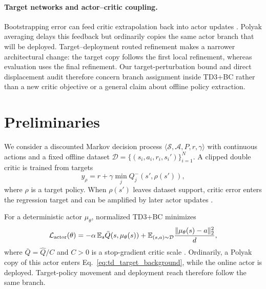 \documentclass[letterpaper]{article}
\begin{document}
\paragraph{Target networks and actor--critic coupling.}
Bootstrapping error can feed critic extrapolation back into actor updates
\citep{fujimoto2019offpolicy,kumar2019bear}. Polyak averaging delays this
feedback but ordinarily copies the same actor branch that will be deployed.
Target--deployment routed refinement makes a narrower architectural change:
the target copy follows the first local refinement, whereas evaluation uses
the final refinement. Our target-perturbation bound and direct displacement
audit therefore concern branch assignment inside TD3+BC rather than a new
critic objective or a general claim about offline policy extraction.

\section{Preliminaries}
\label{sec:background}

We consider a discounted Markov decision process
$\langle\mathcal S,\mathcal A,P,r,\gamma\rangle$ with continuous actions and
a fixed offline dataset $\mathcal D=\{(s_i,a_i,r_i,s_i')\}_{i=1}^N$. A clipped
double critic is trained from targets
\begin{equation}
y_{\rho}=r+\gamma\min_j Q_j^-(s',\rho(s')),
\label{eq:td_target_background}
\end{equation}
where $\rho$ is a target policy. When $\rho(s')$ leaves dataset support,
critic error enters the regression target and can be amplified by later actor
updates \citep{fujimoto2019offpolicy,kumar2019bear}.

For a deterministic actor $\mu_\theta$, normalized TD3+BC minimizes
\begin{equation}
\mathcal L_{\rm actor}(\theta)
=-\alpha\,\mathbb E_s\bar Q(s,\mu_\theta(s))
+\mathbb E_{(s,a)\sim\mathcal D}\frac{\|\mu_\theta(s)-a\|_2^2}{d},
\label{eq:td3bc_background}
\end{equation}
where $\bar Q=\widehat Q/C$ and $C>0$ is a stop-gradient critic scale
\citep{fujimoto2021minimalist}. Ordinarily, a Polyak copy of this actor enters
Eq.~\eqref{eq:td_target_background}, while the online actor is deployed.
Target-policy movement and deployment reach therefore follow the same branch.
\end{document}
